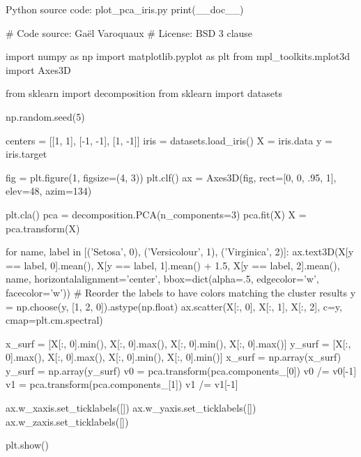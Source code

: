 Python source code: plot_pca_iris.py
print(__doc__)


# Code source: Gaël Varoquaux
# License: BSD 3 clause

import numpy as np
import matplotlib.pyplot as plt
from mpl_toolkits.mplot3d import Axes3D


from sklearn import decomposition
from sklearn import datasets

np.random.seed(5)

centers = [[1, 1], [-1, -1], [1, -1]]
iris = datasets.load_iris()
X = iris.data
y = iris.target

fig = plt.figure(1, figsize=(4, 3))
plt.clf()
ax = Axes3D(fig, rect=[0, 0, .95, 1], elev=48, azim=134)

plt.cla()
pca = decomposition.PCA(n_components=3)
pca.fit(X)
X = pca.transform(X)

for name, label in [('Setosa', 0), ('Versicolour', 1), ('Virginica', 2)]:
ax.text3D(X[y == label, 0].mean(),
X[y == label, 1].mean() + 1.5,
X[y == label, 2].mean(), name,
horizontalalignment='center',
bbox=dict(alpha=.5, edgecolor='w', facecolor='w'))
# Reorder the labels to have colors matching the cluster results
y = np.choose(y, [1, 2, 0]).astype(np.float)
ax.scatter(X[:, 0], X[:, 1], X[:, 2], c=y, cmap=plt.cm.spectral)

x_surf = [X[:, 0].min(), X[:, 0].max(),
X[:, 0].min(), X[:, 0].max()]
y_surf = [X[:, 0].max(), X[:, 0].max(),
X[:, 0].min(), X[:, 0].min()]
x_surf = np.array(x_surf)
y_surf = np.array(y_surf)
v0 = pca.transform(pca.components_[0])
v0 /= v0[-1]
v1 = pca.transform(pca.components_[1])
v1 /= v1[-1]

ax.w_xaxis.set_ticklabels([])
ax.w_yaxis.set_ticklabels([])
ax.w_zaxis.set_ticklabels([])

plt.show()

